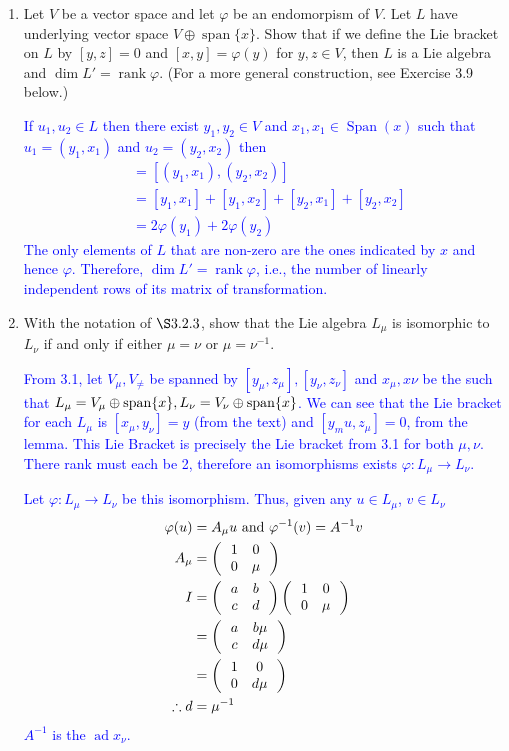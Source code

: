 \documentclass[12pt,a4paper]{report}
\newcommand{\BLUE}[1]{\textcolor{blue}{#1}}
\newcommand{\AD}{\operatorname{ad}}
\begin{document}
\begin{enumerate}[label=3.\arabic*.]

\item Let $V$ be a vector space and let $\varphi$ be an endomorpism of $V$.  Let $L$ have underlying vector space $V \oplus \operatorname{span}\{x\}$.  Show that if we define the Lie bracket on $L$ by $[y,z]=0$ and $[x,y]=\varphi(y)$ for $y,z\in V$, then $L$ is a Lie algebra and $\dim L' = \operatorname{rank} \varphi$.  (For a more general construction, see Exercise 3.9 below.)

\BLUE{If $u_1, u_2 \in L$ then there exist $y_1, y_2 \in V$ and $x_1, x_1 \in \operatorname{Span}({x})$ such that $u_1 = (y_1, x_1)$ and $u_2 = (y_2, x_2)$ then
\begin{align*}
	[u_1, u_2] &= [(y_1, x_1), (y_2, x_2)] \\ &= [y_1, x_1]+[y_1, x_2] + [y_2, x_1] + [y_2, x_2] \\
	&= 2\varphi(y_1)+2\varphi(y_2)
\end{align*}The only elements of $L$ that are non-zero are the ones indicated by $x$ and hence $\varphi$.  Therefore, $\dim L' = \operatorname{rank}\varphi$, i.e., the number of linearly independent rows of its matrix of transformation.
}

\item With the notation of $\S 3.2.3$, show that the Lie algebra $L_\mu$ is isomorphic to $L_\nu$ if and only if either $\mu =\nu$ or $\mu=\nu^{-1}$.

\BLUE{From 3.1, let $V_\mu, V_\ne$ be spanned by $[y_\mu, z_\mu], [y_\nu, z_\nu]$ and $x_\mu, x\nu$ be the such that $L_\mu = V_\mu\oplus \operatorname{span}\{x\},L_\nu = V_\nu\oplus \operatorname{span}\{x\}$.  We can see that the Lie bracket for each $L_\mu$ is $[x_\mu,y_\nu] = y$ (from the text) and $[y_mu, z_\mu] = 0$, from the lemma.  This Lie Bracket is precisely the Lie bracket from 3.1 for both $\mu, \nu$.  There rank must each be 2, therefore an isomorphisms exists $\varphi: L_\mu \to L_\nu$.
}

\BLUE{Let $\varphi: L_\mu \to L_\nu$ be this isomorphism.  Thus, given any $u \in L_\mu$, $v \in L_\nu$
\begin{align*}
	\varphi(u) &= A_\mu u \text{ and } \varphi^{-1}(v) = A^{-1}v \\
	A_\mu &= \left (\,  \begin{array}{c c} 1&0 \\ 0 & \mu \end{array}  \,\right )\\
	I &= \left (\,  \begin{array}{c c} a&b \\ c & d \end{array}  \,\right )\left (\,  \begin{array}{c c} 1&0 \\ 0 & \mu \end{array}  \,\right ) \\
	&= \left (\,  \begin{array}{c c} a&b\mu \\ c & d\mu \end{array}  \,\right )\\
	&= \left (\,  \begin{array}{c c} 1&0 \\ 0 & d\mu \end{array}  \,\right ) \\
	\therefore d &= \mu^{-1}
\end{align*}$A^{-1}$ is the $\AD x_\nu$.
}


\end{enumerate}
\end{document}
